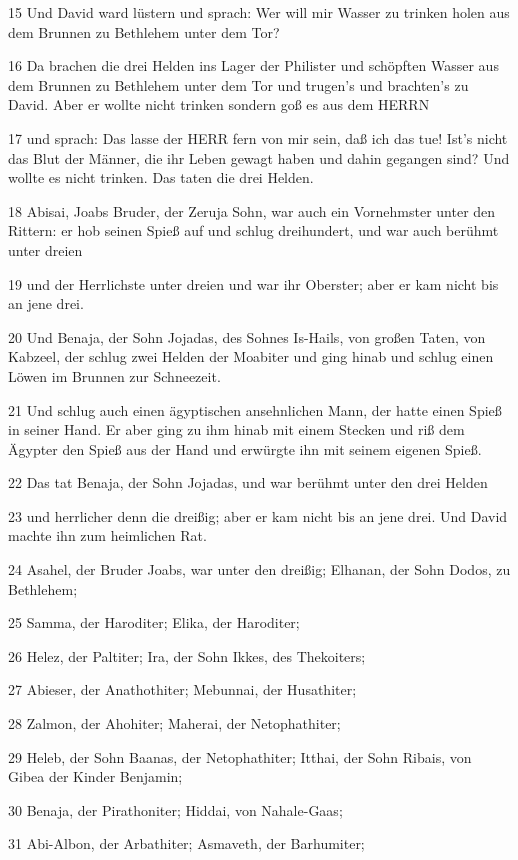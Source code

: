 \par 15 Und David ward lüstern und sprach: Wer will mir Wasser zu trinken holen aus dem Brunnen zu Bethlehem unter dem Tor?
\par 16 Da brachen die drei Helden ins Lager der Philister und schöpften Wasser aus dem Brunnen zu Bethlehem unter dem Tor und trugen's und brachten's zu David. Aber er wollte nicht trinken sondern goß es aus dem HERRN
\par 17 und sprach: Das lasse der HERR fern von mir sein, daß ich das tue! Ist's nicht das Blut der Männer, die ihr Leben gewagt haben und dahin gegangen sind? Und wollte es nicht trinken. Das taten die drei Helden.
\par 18 Abisai, Joabs Bruder, der Zeruja Sohn, war auch ein Vornehmster unter den Rittern: er hob seinen Spieß auf und schlug dreihundert, und war auch berühmt unter dreien
\par 19 und der Herrlichste unter dreien und war ihr Oberster; aber er kam nicht bis an jene drei.
\par 20 Und Benaja, der Sohn Jojadas, des Sohnes Is-Hails, von großen Taten, von Kabzeel, der schlug zwei Helden der Moabiter und ging hinab und schlug einen Löwen im Brunnen zur Schneezeit.
\par 21 Und schlug auch einen ägyptischen ansehnlichen Mann, der hatte einen Spieß in seiner Hand. Er aber ging zu ihm hinab mit einem Stecken und riß dem Ägypter den Spieß aus der Hand und erwürgte ihn mit seinem eigenen Spieß.
\par 22 Das tat Benaja, der Sohn Jojadas, und war berühmt unter den drei Helden
\par 23 und herrlicher denn die dreißig; aber er kam nicht bis an jene drei. Und David machte ihn zum heimlichen Rat.
\par 24 Asahel, der Bruder Joabs, war unter den dreißig; Elhanan, der Sohn Dodos, zu Bethlehem;
\par 25 Samma, der Haroditer; Elika, der Haroditer;
\par 26 Helez, der Paltiter; Ira, der Sohn Ikkes, des Thekoiters;
\par 27 Abieser, der Anathothiter; Mebunnai, der Husathiter;
\par 28 Zalmon, der Ahohiter; Maherai, der Netophathiter;
\par 29 Heleb, der Sohn Baanas, der Netophathiter; Itthai, der Sohn Ribais, von Gibea der Kinder Benjamin;
\par 30 Benaja, der Pirathoniter; Hiddai, von Nahale-Gaas;
\par 31 Abi-Albon, der Arbathiter; Asmaveth, der Barhumiter;
